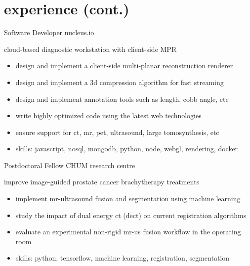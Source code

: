 \documentclass[print]{friggeri-cv}
\begin{document}
\section{experience (cont.)}
\begin{entrylist}
  {Software Developer} {nucleus.io}
  {cloud-based diagnostic workstation with client-side {\small MPR}
  \begin{itemize}
    \item design and implement a client-side multi-planar reconstruction renderer
    \item design and implement a 3d compression algorithm for fast streaming
    \item design and implement annotation tools such as length, cobb angle, etc
    \item write highly optimized code using the latest web technologies
    \item ensure support for ct, mr, pet, ultrasound, large tomosynthesis, etc
    \item skills: javascript, nosql, mongodb, python, node, webgl, rendering, docker
  \end{itemize}}

  {Postdoctoral Fellow}
  {CHUM research centre}
  {improve image-guided prostate cancer brachytherapy treatments
  \begin{itemize}
    \item implement mr-ultrasound fusion and segmentation using machine learning
    \item study the impact of dual energy ct (dect) on current registration algorithms
    \item evaluate an experimental non-rigid mr-us fusion workflow in the operating room
    \item skills: python, tensorflow, machine learning, registration, segmentation
  \end{itemize}}




\end{entrylist}
\end{document}
